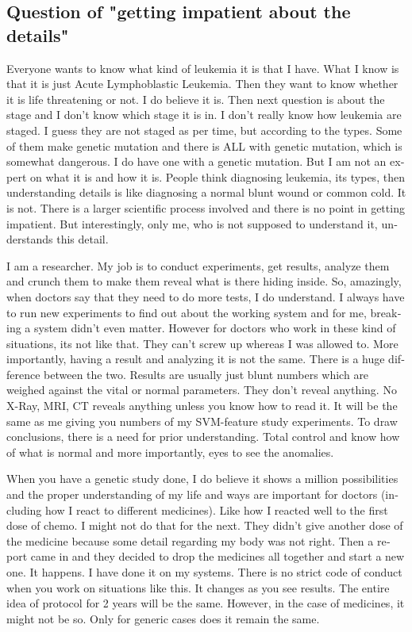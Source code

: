 \begin{english}
\subsection*{Question of "getting impatient about the details"} 

Everyone wants to know what kind of leukemia it is that I have. What I know is that it is just Acute 
Lymphoblastic Leukemia. Then they want to know whether it is life threatening or not. I do believe 
it is. Then next question is about the stage and I don't know which stage it is in. I don't really know 
how leukemia are staged. I guess they are not staged as per time, but according to the types. 
Some of them make genetic mutation and there is ALL with genetic mutation, which is somewhat 
dangerous. I do have one with a genetic mutation. But I am not an expert on what it is and 
how it is. People think diagnosing leukemia, its types, then understanding details is like 
diagnosing a normal blunt wound or common cold. It is not. There is a larger scientific process 
involved and there is no point in getting impatient. But interestingly, only me, who is not 
supposed to understand it, understands this detail.

I am a researcher. My job is to conduct experiments, get results, analyze them and crunch them 
to make them reveal what is there hiding inside. So, amazingly, when doctors say that they need to do 
more tests, I do understand. I always have to run new experiments to find out about the working system 
and for me, breaking a system didn't even matter. However for doctors who work in these kind of 
situations, its not like that. They can't screw up whereas I was allowed to. More importantly, having 
a result and analyzing it is not the same. There is a huge difference between the two. Results are 
usually just blunt numbers which are weighed against the vital or normal parameters. They 
don't reveal anything. No X-Ray, MRI, CT reveals anything unless you know how to read it. It 
will be the same as me giving you numbers of my SVM-feature study experiments. To draw conclusions, 
there is a need for prior understanding. Total control and know how of what is normal and more 
importantly, eyes to see the anomalies. 

When you have a genetic study done, I do believe it shows a million possibilities and the proper 
understanding of my life and ways are important for doctors (including how I react to different 
medicines). Like how I reacted well to the first dose of chemo. I might not do that for the next. They didn't
give another dose of the medicine because some detail regarding my body was not right. Then a report came in and 
they decided to drop the medicines all together and start a new one. It happens. I have done it on 
my systems. There is no strict code of conduct when you work on situations like this. It changes 
as you see results. The entire idea of protocol for 2 years will be the same. However, in the case of medicines, it might not be so. Only for 
generic cases does it remain the same. 


\end{english}
